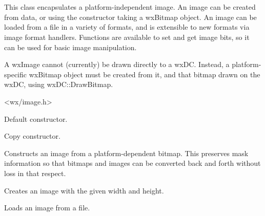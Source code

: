 \section{}\label{wximage}

This class encapsulates a platform-independent image. An image can be created
from data, or using the constructor taking a wxBitmap object. An image
can be loaded from a file in a variety of formats, and is extensible to new formats
via image format handlers. Functions are available to set and get image bits, so
it can be used for basic image manipulation.

A wxImage cannot (currently) be drawn directly to a wxDC. Instead, a platform-specific
wxBitmap object must be created from it, and that bitmap drawn on the wxDC, using
wxDC::DrawBitmap.




<wx/image.h>




\label{wximageconstr}


Default constructor.


Copy constructor.


Constructs an image from a platform-dependent bitmap. This preserves
mask information so that bitmaps and images can be converted back
and forth without loss in that respect.


Creates an image with the given width and height.



Loads an image from a file.

